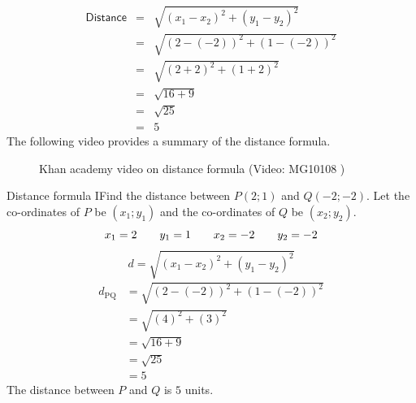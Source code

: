     \begin{eqnarray*}
\mathsf{Distance} & = & \sqrt{{({x}_{1}-{x}_{2})}^{2} + {({y}_{1}-{y}_{2})}^{2}} \\ 
& =& \sqrt{{(2 - (-2))}^{2} + {(1 - (-2))}^{2}} \\ 
& =& \sqrt{{(2 + 2)}^{2} + {(1+2)}^{2}} \\ 
& =& \sqrt{16 + 9} \\
& =& \sqrt{25} \\ 
& =& 5
      \end{eqnarray*}
        \label{m39107*eip-130}The following video provides a summary of the distance formula.
    \setcounter{subfigure}{0}
	\begin{figure}[H] %
    \textnormal{Khan academy video on distance formula}\vspace{.1in} \nopagebreak
  \label{m39107*yt-media}\label{m39107*yt-video}
             { (Video:  MG10108 )}
      \vspace{2pt}
    \vspace{.1in}
 \end{figure}       \par 
      \label{m39107**end}

\begin{wex}{Distance formula I}{Find the distance between $P(2;1)$ and $Q(-2;-2)$.}{
Let the co-ordinates of $P$ be $(x_1;y_1)$ and the co-ordinates of $Q$ be $(x_2;y_2)$.
\begin{equation*}
 x_1 = 2 \hskip2em y_1 = 1 \hskip2em x_2 = -2 \hskip2em y_2 = -2
\end{equation*}
\begin{equation*}
 d = \sqrt{(x_1 - x_2)^2 + (y_1 - y_2)^2}
\end{equation*}
\begin{equation*}
 \begin{array}{cl}
  d_{\mathrm{PQ}} &= \sqrt{(2 - (-2))^2 + (1 - (-2))^2}\\
  & = \sqrt{(4)^2 + (3)^2}\\
  &= \sqrt{16 + 9}\\
  &= \sqrt{25}\\
  &= 5
 \end{array}
\end{equation*}
The distance between $P$ and $Q$ is $5$ units.
\vspace{2pt}
    \vspace{.1in}
}
\end{wex}

